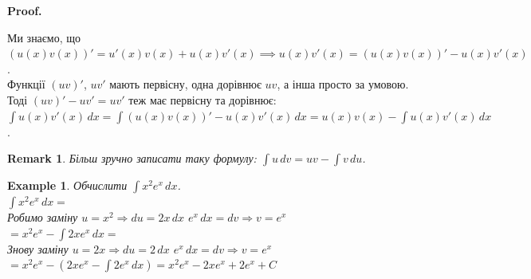\documentclass[a4paper, 10pt]{article}
\makeatletter
\def\huge{\displaystyle}
\def\qed{$\blacksquare$}
\theoremstyle{theoremdd}
\theoremstyle{theoremdd}
\theoremstyle{theoremdd}
\theoremstyle{theoremdd}
\theoremstyle{theoremdd}
\newtheorem{example}[theorem]{Example}
\theoremstyle{theoremdd}
\theoremstyle{theoremdd}
\newtheorem{remark}[theorem]{Remark}
\theoremstyle{theoremdd}
\theoremstyle{theoremdd}
\renewenvironment{proof}[1][Proof.\\]{\par
\pushQED{\hfill \qed}%
\normalfont \topsep6\p@\@plus6\p@\relax
\trivlist
\item\relax
{\bfseries
#1\@addpunct{.}}\hspace\labelsep\ignorespaces
}{%
\popQED\endtrivlist\@endpefalse
}
\makeatother
\begin{document}
\begin{proof}
Ми знаємо, що $(u(x)v(x))' = u'(x)v(x) + u(x)v'(x) \implies u(x)v'(x) = (u(x)v(x))' - u(x)v'(x)$.\\
Функції $(uv)'$, $uv'$ мають первісну, одна дорівнює $uv$, а інша просто за умовою. Тоді $(uv)' - uv' = uv'$ теж має первісну та дорівнює:\\
$\huge\int u(x)v'(x)\,dx = \int (u(x)v(x))' - u(x)v'(x)\,dx = u(x)v(x) - \int u(x)v'(x)\,dx$.
\end{proof}

\begin{remark}
Більш зручно записати таку формулу: $\huge \int u\,dv = uv - \int v\,du$.
\end{remark}

\begin{example}
Обчислити $\huge \int x^2 e^x \,dx$.\\
$\huge \int x^2 e^x \,dx \boxed{=}$\\
Робимо заміну $u = x^2 \Rightarrow du = 2x\,dx$ \hspace{1cm} $e^x\,dx = dv \Rightarrow v = e^x$\\
$\boxed{=} x^2 e^x - \huge \int 2x e^x\,dx \boxed{\boxed{=}}$\\
Знову заміну $u = 2x \Rightarrow du = 2\,dx$ \hspace{1cm} $e^x\,dx = dv \Rightarrow v = e^x$\\
$\boxed{\boxed{=}} x^2 e^x - (2xe^x - \huge \int 2e^x \,dx) = x^2 e^x - 2xe^x + 2e^x + C$
\end{example}
\end{document}
